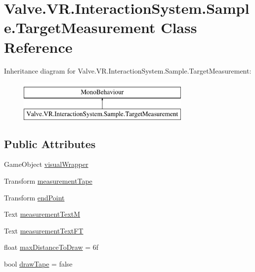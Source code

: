 \hypertarget{class_valve_1_1_v_r_1_1_interaction_system_1_1_sample_1_1_target_measurement}{}\section{Valve.\+V\+R.\+Interaction\+System.\+Sample.\+Target\+Measurement Class Reference}
\label{class_valve_1_1_v_r_1_1_interaction_system_1_1_sample_1_1_target_measurement}
Inheritance diagram for Valve.\+V\+R.\+Interaction\+System.\+Sample.\+Target\+Measurement\+:\begin{figure}[H]
\begin{center}
\leavevmode
\includegraphics[height=2.000000cm]{class_valve_1_1_v_r_1_1_interaction_system_1_1_sample_1_1_target_measurement}
\end{center}
\end{figure}
\subsection*{Public Attributes}
\begin{DoxyCompactItemize}
\item 
Game\+Object \mbox{\hyperlink{class_valve_1_1_v_r_1_1_interaction_system_1_1_sample_1_1_target_measurement_acdec826d59fe870a5cc1dcf4ea41a598}{visual\+Wrapper}}
\item 
Transform \mbox{\hyperlink{class_valve_1_1_v_r_1_1_interaction_system_1_1_sample_1_1_target_measurement_a1515f98534321d71423b5d75ea3e161a}{measurement\+Tape}}
\item 
Transform \mbox{\hyperlink{class_valve_1_1_v_r_1_1_interaction_system_1_1_sample_1_1_target_measurement_aabdaaf815887a1a456adaaa39023fc1b}{end\+Point}}
\item 
Text \mbox{\hyperlink{class_valve_1_1_v_r_1_1_interaction_system_1_1_sample_1_1_target_measurement_a63412fa65bd78474588e0db0deb42423}{measurement\+TextM}}
\item 
Text \mbox{\hyperlink{class_valve_1_1_v_r_1_1_interaction_system_1_1_sample_1_1_target_measurement_adbb58d8e83802d333cf2753ca6dd9be9}{measurement\+Text\+FT}}
\item 
float \mbox{\hyperlink{class_valve_1_1_v_r_1_1_interaction_system_1_1_sample_1_1_target_measurement_ae71bb703a575c107b2d5a614e2871969}{max\+Distance\+To\+Draw}} = 6f
\item 
bool \mbox{\hyperlink{class_valve_1_1_v_r_1_1_interaction_system_1_1_sample_1_1_target_measurement_a737097814acb4d357bf1fd134e93bbc1}{draw\+Tape}} = false
\end{DoxyCompactItemize}


